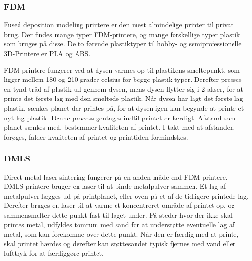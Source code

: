 
\subsubsection{FDM} %
\label{ssub:fdm}

Fused deposition modeling printere er den mest almindelige printer til privat brug. Der findes mange typer FDM-printere, og mange forskellige typer plastik som bruges på disse. De to førende plastiktyper til hobby- og semiprofessionelle 3D-Printere er PLA og ABS.\autocite{_3d-guide:_????} 

FDM-printere fungerer ved at dysen varmes op til plastikens smeltepunkt, som ligger mellem 180 og 210 grader celsius for begge plastik typer. Derefter presses en tynd tråd af plastik ud gennem dysen, mens dysen flytter sig i 2 akser, for at printe det første lag med den smeltede plastik. 
Når dysen har lagt det første lag plastik, sænkes planet der printes på, for at dysen igen kan begynde at printe et nyt lag plastik. Denne process gentages indtil printet er færdigt. 
Afstand som planet sænkes med, bestemmer kvaliteten af printet. I takt med at afstanden forøges, falder kvaliteten af printet og printtiden formindskes.


\subsubsection{DMLS} %
\label{ssub:dmls}

Direct metal laser sintering fungerer på en anden måde end FDM-printere. DMLS-printere bruger en laser til at binde metalpulver sammen. Et lag af metalpulver lægges ud på printplanet, eller oven på et af de tidligere printede lag. Derefter bruges en laser til at varme et koncentreret område af printet op, og sammensmelter dette punkt fast til laget under. På steder hvor der ikke skal printes metal, udfyldes tomrum med sand for at understøtte eventuelle lag af metal, som kan forekomme over dette punkt.\autocite{manyika_disruptive_2013}
Når den er færdig med at printe, skal printet hærdes og derefter kan støttesandet typisk fjernes med vand eller lufttryk for at færdiggøre printet\autocite{manyika_disruptive_2013}.
\newpage



